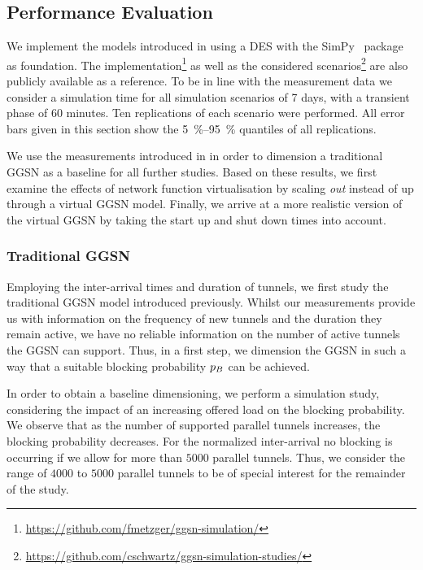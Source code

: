 \subsection{Performance Evaluation}\label{sec:cloud:virtualized_network_functions:performance_evaluation}

We implement the models introduced in  using a \gls{DES} with the SimPy~\cite{SimPy2015} package as foundation.
The implementation\footnote{\url{https://github.com/fmetzger/ggsn-simulation/}} as well as the considered scenarios\footnote{\url{https://github.com/cschwartz/ggsn-simulation-studies/}} are also publicly available as a reference.
To be in line with the measurement data we consider a simulation time for all simulation scenarios of 7 days, with a transient phase of 60 minutes.
Ten replications of each scenario were performed.
All error bars given in this section show the \SIrange{5}{95}{\percent} quantiles of all replications.

We use the measurements introduced in  in order to dimension a traditional \gls{GGSN} as a baseline for all further studies.
Based on these results, we first examine the effects of network function virtualisation by scaling \emph{out} instead of up through a virtual \gls{GGSN} model.
Finally, we arrive at a more realistic version of the virtual \gls{GGSN} by taking the start up and shut down times into account.

\subsubsection*{Traditional GGSN}\label{sec:cloud:virtualized_network_functions:performance_evaluation:traditional_ggsn}

Employing the inter-arrival times and duration of tunnels, we first study the traditional \gls{GGSN} model introduced previously.
Whilst our measurements provide us with information on the frequency of new tunnels and the duration they remain active, we have no reliable information on the number of active tunnels the \gls{GGSN} can support.
Thus, in a first step, we dimension the \gls{GGSN} in such a way that a suitable blocking probability \(p_B\) can be achieved.


In order to obtain a baseline dimensioning, we perform a simulation study, considering the impact of an increasing offered load on the blocking probability.
We observe that as the number of supported parallel tunnels increases, the blocking probability decreases.
For the normalized inter-arrival no blocking is occurring if we allow for more than \(5000\) parallel tunnels.
Thus, we consider the range of \(4000\) to \(5000\) parallel tunnels to be of special interest for the remainder of the study.

